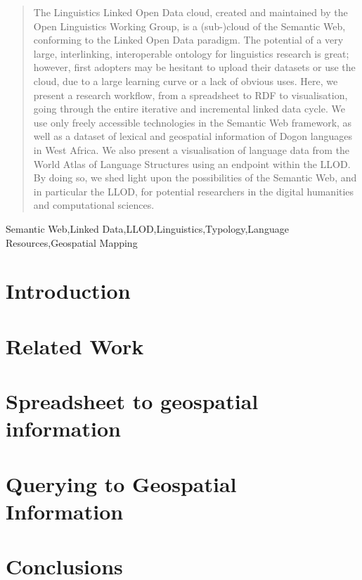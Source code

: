 \documentclass{iosart2c}
\begin{document}
\begin{frontmatter}
\begin{abstract}
The Linguistics Linked Open Data cloud, created and maintained by the Open Linguistics Working Group, is a (sub-)cloud of the Semantic Web, conforming to the Linked Open Data paradigm. The potential of a very large, interlinking, interoperable ontology for linguistics research is great; however, first adopters may be hesitant to upload their datasets or use the cloud, due to a large learning curve or a lack of obvious uses. Here, we present a research workflow, from a spreadsheet to RDF to visualisation, going through the entire iterative and incremental linked data cycle. We use only freely accessible technologies in the Semantic Web framework, as well as a dataset of lexical and geospatial information of Dogon languages in West Africa. We also present a visualisation of language data from the World Atlas of Language Structures using an endpoint within the LLOD. By doing so, we shed light upon the possibilities of the Semantic Web, and in particular the LLOD, for potential researchers in the digital humanities and computational sciences. %
\end{abstract}

\begin{keyword}
Semantic Web\sep Linked Data\sep LLOD\sep Linguistics\sep Typology\sep Language Resources\sep Geospatial Mapping
\end{keyword}

\end{frontmatter}


\section{Introduction}


\section{Related Work}


\section{Spreadsheet to geospatial information}


\section{Querying to Geospatial Information}


\section{Conclusions}




\end{document}
